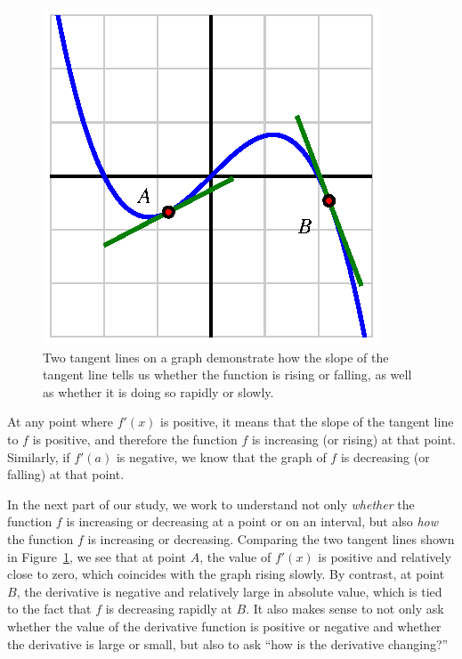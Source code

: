 \begin{figure}[h]
\begin{center}
\includegraphics{figures/1_6_Intro.eps}
\caption{Two tangent lines on a graph demonstrate how the slope of the tangent line tells us whether the function is rising or falling, as well as whether it is doing so rapidly or slowly.} \label{F:1.6.Intro}
\end{center}
\end{figure}

At any point where $f'(x)$ is positive, it means that the slope of the tangent line to $f$ is positive, and therefore the function $f$ is increasing (or rising)  at that point.  Similarly, if $f'(a)$ is negative, we know that the graph of $f$ is decreasing  (or falling) at that point.   

In the next part of our study, we work to understand not only \emph{whether} the function $f$ is increasing or decreasing at a point or on an interval, but also \emph{how} the function $f$ is increasing or decreasing.  Comparing the two tangent lines shown in Figure~\ref{F:1.6.Intro}, we see that at point $A$, the value of $f'(x)$ is positive and relatively close to zero, which coincides with the graph rising slowly.  By contrast, at point $B$, the derivative is negative and relatively large in absolute value, which is tied to the fact that $f$ is decreasing rapidly at $B$.  It also makes sense to not only ask whether the value of the derivative function is positive or negative and whether the derivative is large or small, but also to ask ``how is the derivative changing?''


